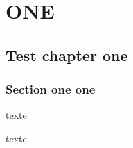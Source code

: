 \documentclass{book}
\begin{document}

\tableofcontents


\part{ONE}

\renewcommand\contentsname{Local contents}

\localtableofcontents


\chapter{Test chapter one}

\localtableofcontents

\section{Section one one}

\localtableofcontents


texte

\localtableofcontents

texte
\end{document}
